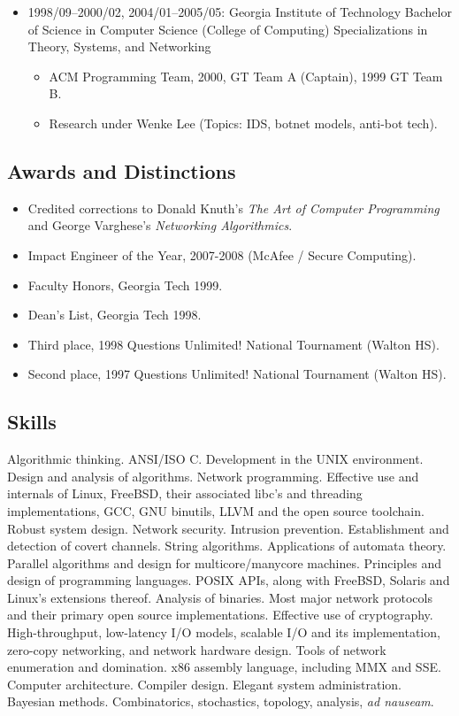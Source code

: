 \documentclass{article}
\newenvironment{tightitemize}
{\begin{itemize}
  \setlength{\itemsep}{1pt}
  \setlength{\parskip}{0pt}
  \setlength{\parsep}{0pt}}
{\end{itemize}}
\begin{document}
\begin{tightitemize}
\item 1998/09--2000/02, 2004/01--2005/05: Georgia Institute of Technology
Bachelor of Science in Computer Science (College of Computing)
Specializations in Theory, Systems, and Networking

\begin{tightitemize}
\item ACM Programming Team, 2000, GT Team A (Captain), 1999 GT Team B.
\item Research under Wenke Lee (Topics: IDS, botnet models, anti-bot tech).
\end{tightitemize}

\end{tightitemize}

\subsection*{Awards and Distinctions}

\begin{tightitemize}
\item Credited corrections to Donald Knuth's \textit{The Art of Computer Programming}
   and George Varghese's \textit{Networking Algorithmics}.
\item Impact Engineer of the Year, 2007-2008 (McAfee / Secure Computing).
\item Faculty Honors, Georgia Tech 1999.
\item Dean's List, Georgia Tech 1998.
\item Third place, 1998 Questions Unlimited! National Tournament (Walton HS).
\item Second place, 1997 Questions Unlimited! National Tournament (Walton HS).
\end{tightitemize}

\subsection*{Skills}

Algorithmic thinking. ANSI/ISO C. Development in the UNIX environment. Design
and analysis of algorithms. Network programming. Effective use and internals
of Linux, FreeBSD, their associated libc's and threading implementations,
GCC, GNU binutils, LLVM and the open source toolchain. Robust system design.
Network security. Intrusion prevention. Establishment and detection of covert
channels. String algorithms. Applications of automata theory. Parallel
algorithms and design for multicore/manycore machines. Principles and design
of programming languages. POSIX APIs, along with FreeBSD, Solaris and Linux's
extensions thereof. Analysis of binaries. Most major network protocols and
their primary open source implementations. Effective use of cryptography.
High-throughput, low-latency I/O models, scalable I/O and its implementation,
zero-copy networking, and network hardware design. Tools of network
enumeration and domination. x86 assembly language, including MMX and SSE.
Computer architecture. Compiler design. Elegant system administration.
Bayesian methods. Combinatorics, stochastics, topology, analysis, \textit{ad nauseam}.
\end{document}
